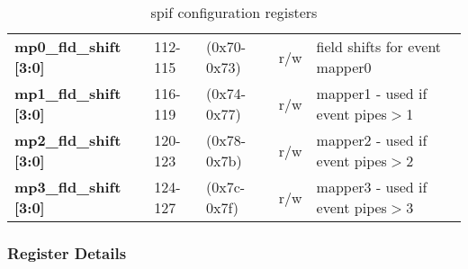 \documentclass[11pt,a4paper,twoside]{article}
\begin{document}
\begin{center}
\begin{table}[!h]
\begin{tabularx}{\textwidth}{| p{36mm} p{13mm} p{21mm} p{7mm} X |}
		\textbf{mp0\_fld\_shift [3:0]}       & 112-115                    & (0x70-0x73)                    & r/w                 & field shifts for event mapper0  \\%
		\textbf{mp1\_fld\_shift [3:0]}       & 116-119                    & (0x74-0x77)                    & r/w                 & mapper1 - used if event pipes$>$1  \\%
		\textbf{mp2\_fld\_shift [3:0]}       & 120-123                    & (0x78-0x7b)                    & r/w                 & mapper2 - used if event pipes$>$2  \\%
		\textbf{mp3\_fld\_shift [3:0]}       & 124-127                    & (0x7c-0x7f)                    & r/w                 & mapper3 - used if event pipes$>$3  \\%
		\hline
	\end{tabularx}
	\caption{spif configuration registers}
	\label{tab:spif_regs}
\end{table}
\end{center}


\vspace{-5mm}
    
\subsubsection*{Register Details}
\end{document}
